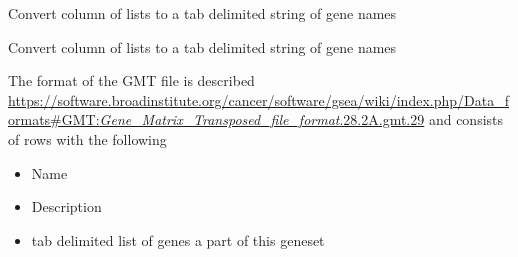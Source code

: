 \documentclass[
]{book}
\newenvironment{Shaded}{\begin{snugshade}}{\end{snugshade}}
\newcommand{\AttributeTok}[1]{\textcolor[rgb]{0.77,0.63,0.00}{#1}}
\newcommand{\ControlFlowTok}[1]{\textcolor[rgb]{0.13,0.29,0.53}{\textbf{#1}}}
\newcommand{\DecValTok}[1]{\textcolor[rgb]{0.00,0.00,0.81}{#1}}
\newcommand{\FunctionTok}[1]{\textcolor[rgb]{0.00,0.00,0.00}{#1}}
\newcommand{\NormalTok}[1]{#1}
\newcommand{\OtherTok}[1]{\textcolor[rgb]{0.56,0.35,0.01}{#1}}
\newcommand{\SpecialCharTok}[1]{\textcolor[rgb]{0.00,0.00,0.00}{#1}}
\newcommand{\StringTok}[1]{\textcolor[rgb]{0.31,0.60,0.02}{#1}}
\providecommand{\tightlist}{%
  \setlength{\itemsep}{0pt}\setlength{\parskip}{0pt}}
\begin{document}
Convert column of lists to a tab delimited string of gene names

\begin{Shaded}
\end{Shaded}

Convert column of lists to a tab delimited string of gene names

\begin{Shaded}
\end{Shaded}

The format of the GMT file is described \href{here}{https://software.broadinstitute.org/cancer/software/gsea/wiki/index.php/Data\_formats\#GMT:\emph{Gene\_Matrix\_Transposed\_file\_format}.28.2A.gmt.29} and consists of rows with the following

\begin{itemize}
\tightlist
\item
  Name
\item
  Description
\item
  tab delimited list of genes a part of this geneset
\end{itemize}
\end{document}
